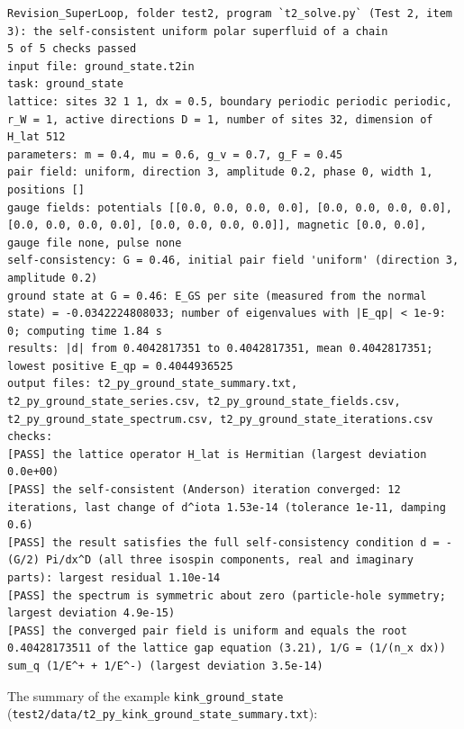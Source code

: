\documentclass[
  10pt,
]{article}
\begin{document}
\begin{verbatim}
Revision_SuperLoop, folder test2, program `t2_solve.py` (Test 2, item 3): the self-consistent uniform polar superfluid of a chain
5 of 5 checks passed
input file: ground_state.t2in
task: ground_state
lattice: sites 32 1 1, dx = 0.5, boundary periodic periodic periodic, r_W = 1, active directions D = 1, number of sites 32, dimension of H_lat 512
parameters: m = 0.4, mu = 0.6, g_v = 0.7, g_F = 0.45
pair field: uniform, direction 3, amplitude 0.2, phase 0, width 1, positions []
gauge fields: potentials [[0.0, 0.0, 0.0, 0.0], [0.0, 0.0, 0.0, 0.0], [0.0, 0.0, 0.0, 0.0], [0.0, 0.0, 0.0, 0.0]], magnetic [0.0, 0.0], gauge file none, pulse none
self-consistency: G = 0.46, initial pair field 'uniform' (direction 3, amplitude 0.2)
ground state at G = 0.46: E_GS per site (measured from the normal state) = -0.0342224808033; number of eigenvalues with |E_qp| < 1e-9: 0; computing time 1.84 s
results: |d| from 0.4042817351 to 0.4042817351, mean 0.4042817351; lowest positive E_qp = 0.4044936525
output files: t2_py_ground_state_summary.txt, t2_py_ground_state_series.csv, t2_py_ground_state_fields.csv, t2_py_ground_state_spectrum.csv, t2_py_ground_state_iterations.csv
checks:
[PASS] the lattice operator H_lat is Hermitian (largest deviation 0.0e+00)
[PASS] the self-consistent (Anderson) iteration converged: 12 iterations, last change of d^iota 1.53e-14 (tolerance 1e-11, damping 0.6)
[PASS] the result satisfies the full self-consistency condition d = -(G/2) Pi/dx^D (all three isospin components, real and imaginary parts): largest residual 1.10e-14
[PASS] the spectrum is symmetric about zero (particle-hole symmetry; largest deviation 4.9e-15)
[PASS] the converged pair field is uniform and equals the root 0.40428173511 of the lattice gap equation (3.21), 1/G = (1/(n_x dx)) sum_q (1/E^+ + 1/E^-) (largest deviation 3.5e-14)
\end{verbatim}

The summary of the example \texttt{kink\_ground\_state}
(\texttt{test2/data/t2\_py\_kink\_ground\_state\_summary.txt}):
\end{document}

